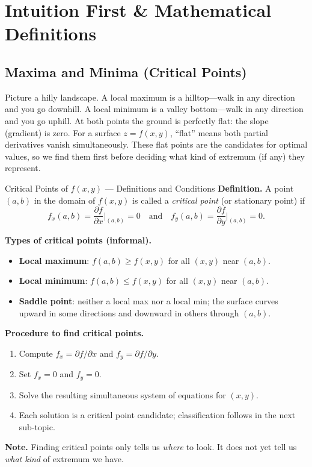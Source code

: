 \documentclass[12pt,a4paper]{article}
\begin{document}
\section{Intuition First \& Mathematical Definitions}

\subsection{Maxima and Minima (Critical Points)}

Picture a hilly landscape. A local maximum is a hilltop---walk in any direction and you go downhill. A local minimum is a valley bottom---walk in any direction and you go uphill. At both points the ground is perfectly flat: the slope (gradient) is zero. For a surface $z = f(x,y)$, ``flat'' means both partial derivatives vanish simultaneously. These flat points are the candidates for optimal values, so we find them first before deciding what kind of extremum (if any) they represent.

\begin{infobox}{Critical Points of $f(x,y)$ --- Definitions and Conditions}
\textbf{Definition.} A point $(a,b)$ in the domain of $f(x,y)$ is called a \emph{critical point} (or stationary point) if
\[
  f_x(a,b) = \frac{\partial f}{\partial x}\bigg|_{(a,b)} = 0
  \quad \text{and} \quad
  f_y(a,b) = \frac{\partial f}{\partial y}\bigg|_{(a,b)} = 0.
\]

\textbf{Types of critical points (informal).}
\begin{itemize}
  \item \textbf{Local maximum}: $f(a,b) \geq f(x,y)$ for all $(x,y)$ near $(a,b)$.
  \item \textbf{Local minimum}: $f(a,b) \leq f(x,y)$ for all $(x,y)$ near $(a,b)$.
  \item \textbf{Saddle point}: neither a local max nor a local min; the surface curves upward in some directions and downward in others through $(a,b)$.
\end{itemize}

\textbf{Procedure to find critical points.}
\begin{enumerate}
  \item Compute $f_x = \partial f/\partial x$ and $f_y = \partial f/\partial y$.
  \item Set $f_x = 0$ and $f_y = 0$.
  \item Solve the resulting simultaneous system of equations for $(x,y)$.
  \item Each solution is a critical point candidate; classification follows in the next sub-topic.
\end{enumerate}

\textbf{Note.} Finding critical points only tells us \emph{where} to look. It does not yet tell us \emph{what kind} of extremum we have.
\end{infobox}
\end{document}
